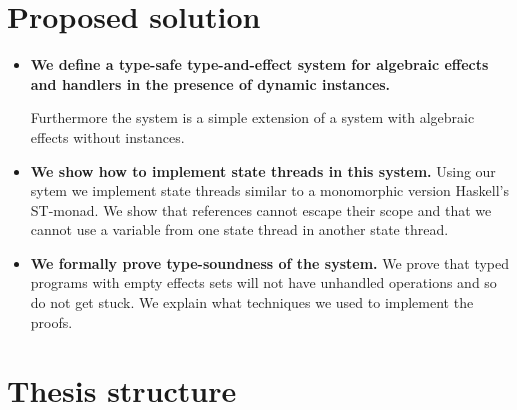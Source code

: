 \section{Proposed solution}
\begin{itemize}

\item \textbf{We define a type-safe type-and-effect system for algebraic effects and handlers in the presence of dynamic instances.}

Furthermore the system is a simple extension of a system with algebraic effects without instances.

\item \textbf{We show how to implement state threads in this system.}
Using our sytem we implement state threads similar to a monomorphic version Haskell's ST-monad.
We show that references cannot escape their scope and that we cannot use a variable from one state thread in another state thread.

\item \textbf{We formally prove type-soundness of the system.}
We prove that typed programs with empty effects sets will not have unhandled operations and so do not get stuck.
We explain what techniques we used to implement the proofs.


\end{itemize}

\section{Thesis structure}
